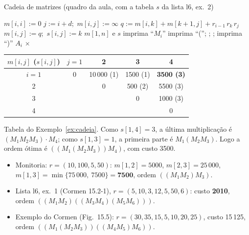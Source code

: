 \begin{pseudo}{Cadeia de matrizes (quadro da aula, com a tabela $s$ da lista l6, ex.~2)}
\begin{algorithmic}
   \State $m[i,i]:=0$ \EndFor
   
     
      \State $j:=i+d$;\ $m[i,j]:=\infty$
        \State $q:=m[i,k]+m[k+1,j]+r_{i-1}\,r_k\,r_j$
         \State $m[i,j]:=q$;\ $s[i,j]:=k$ \EndIf
      \EndFor
    \EndFor
  \EndFor
  \State \Return $m[1,n]$ e $s$
\EndFunction
{}
   \State imprima ``$M_i$''
  \Else \State imprima ``(''; ; ; imprima ``)''
  \EndIf
\EndProcedure
{} 
   \State \Return $A_i$ \EndIf
  \State \Return {} $\times$ 
\EndFunction
\end{algorithmic}
\end{pseudo}

\begin{center}\small
\begin{tabular}{c|cccc}
$m[i,j]$ ($s[i,j]$) & $j=1$ & 2 & 3 & 4\\ \hline
$i=1$ & 0 & 10\,000 (1) & 1500 (1) & \textbf{3500 (3)}\\
2 & & 0 & 500 (2) & 5500 (3)\\
3 & & & 0 & 1000 (3)\\
4 & & & & 0
\end{tabular}
\end{center}
Tabela do Exemplo~\ref{ex:cadeia}. Como $s[1,4]=3$, a última multiplicação é $(M_1M_2M_3)\cdot M_4$; como $s[1,3]=1$, a primeira parte é $M_1(M_2M_3)$. Logo a ordem ótima é $((M_1(M_2M_3))M_4)$, com custo 3500.
\begin{itemize}
  \item Monitoria: $r=(10,100,5,50)$: $m[1,2]=5000$, $m[2,3]=25\,000$, $m[1,3]=\min\{75\,000,\ 7500\}=\mathbf{7500}$, ordem $((M_1M_2)M_3)$.
  \item Lista l6, ex.~1 (Cormen 15.2-1), $r=(5,10,3,12,\allowbreak5,50,6)$: custo \textbf{2010}, ordem $((M_1M_2)\allowbreak((M_3M_4)\allowbreak(M_5M_6)))$.
  \item Exemplo do Cormen (Fig.~15.5): $r=(30,35,15,5,\allowbreak10,20,25)$, custo 15\,125, ordem $((M_1(M_2M_3))\allowbreak((M_4M_5)M_6))$.
\end{itemize}

